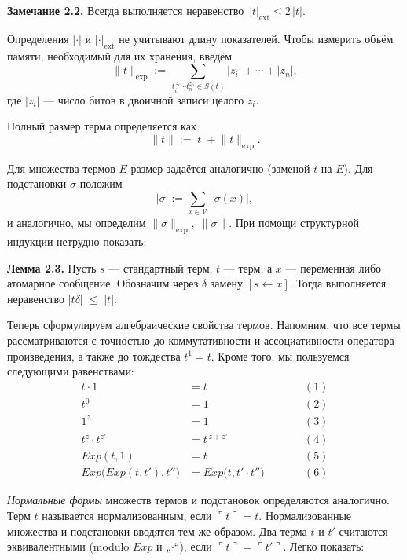 \medskip
\noindent
\textbf{Замечание 2.2.}\;
Всегда выполняется неравенство $\,|t|_{\text{ext}} \le 2\,|t|$.

\medskip
Определения $|\cdot|$ и $|\cdot|_{\text{ext}}$ не учитывают длину показателей.  
Чтобы измерить объём памяти, необходимый для их хранения, введём
\[
\lVert t\rVert_{\text{exp}} := 
\sum_{\,t_i^{\,z_i}\cdots t_n^{z_n}\in S(t)} |z_i| + \cdots + |z_n|,
\]
где $|z_i|$ — число битов в двоичной записи целого $z_i$.

Полный размер терма определяется как
\[
\lVert t\rVert := |t| + \lVert t\rVert_{\text{exp}}.
\]

Для множества термов $E$ размер задаётся аналогично (заменой $t$ на $E$).  
Для подстановки $\sigma$ положим
\[
|\sigma| := \sum_{x\in\mathcal{V}} |\,\sigma(x)|,
\]
и аналогично, мы определим $\lVert \sigma\rVert_{\text{exp}},\; \lVert \sigma\rVert$.
При помощи структурной индукции нетрудно показать:

\noindent
\textbf{Лемма 2.3.}\;
Пусть $s$ — стандартный терм, $t$ — терм, а $x$ — переменная либо
атомарное сообщение. Обозначим через $\delta$ замену $[s \leftarrow x]$.
Тогда выполняется неравенство $|t\delta| \;\le\; |t|$.

Теперь сформулируем алгебраические свойства термов. Напомним, что все термы
рассматриваются с точностью до коммутативности и ассоциативности оператора
произведения, а также до тождества $t^1 = t$. Кроме того, мы пользуемся следующими равенствами:
\[
\begin{aligned}
t\cdot 1   &= t      &\qquad&(1)\\
t^0        &= 1      &\qquad&(2)\\
1^z        &= 1      &\qquad&(3)\\
t^z\!\cdot t^{z'} &= t^{\,z+z'} &\qquad&(4)\\
Exp(t,1)  &= t      &\qquad&(5)\\
Exp\!\bigl(Exp(t,t'),t''\bigr) &= Exp\!\bigl(t,t'\!\cdot t''\bigr) &\qquad&(6)
\end{aligned}
\]

\textit{Нормальные формы} множеств термов и подстановок определяются аналогично.  
Терм \(t\) называется нормализованным, если \(\ulcorner t\urcorner = t\).  
Нормализованные множества и подстановки вводятся тем же образом.  
Два терма \(t\) и \(t'\) считаются эквивалентными (modulo \(Exp\) и „\(\cdot\)“),  
если \(\ulcorner t\urcorner = \ulcorner t'\urcorner\).  
Легко показать:

